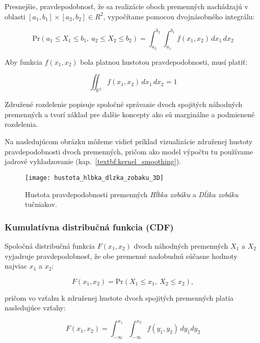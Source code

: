 Presnejšie, pravdepodobnosť, že sa realizácie oboch premenných nachádzajú v oblasti $[a_1, b_1] \times [a_2, b_2] \in R^2$, vypočítame pomocou dvojnásobného integrálu:

\begin{equation}
\mathrm{Pr}(a_1 \leq X_1 \leq b_1,\ a_2 \leq X_2 \leq b_2) = \int_{a_2}^{b_2} \int_{a_1}^{b_1} f(x_1, x_2) \, dx_1 \, dx_2
\end{equation}

Aby funkcia $f(x_1, x_2)$ bola platnou hustotou pravdepodobnosti, musí platiť:

\begin{equation}
\iint_{\mathbb{R}^2} f(x_1, x_2) \, dx_1 \, dx_2 = 1
\end{equation}

Združené rozdelenie popisuje spoločné správanie dvoch spojitých náhodných premenných a tvorí základ pre ďalšie koncepty ako sú marginálne a podmienené rozdelenia.

Na nasledujúcom obrázku môžeme vidieť príklad vizualizácie združenej hustoty pravdepodobnosti dvoch premenných, pričom ako model výpočtu tu používame jadrové vyhladzovanie (kap.~\ref{textbf:kernel_smoothing}).

\begin{figure}[htpb]
    \centering
    \texttt{[image: hustota\_hlbka\_dlzka\_zobaku\_3D]}
    \caption{Hustota pravdepodobnosti premenných \textit{Hĺbka zobáku} a \textit{Dĺžka zobáku} tučniakov.}
    \label{fig:zobak_joint_density}
\end{figure}

\subsubsection{Kumulatívna distribučná funkcia (CDF)}\label{subsec:joint_cdf}

Spoločná distribučná funkcia $F(x_1, x_2)$ dvoch náhodných premenných $X_1$ a $X_2$ vyjadruje pravdepodobnosť, že obe premenné nadobudnú súčasne hodnoty najviac $x_1$ a $x_2$:

\begin{equation}
F(x_1, x_2) = \mathrm{Pr}(X_1 \leq x_1,\ X_2 \leq x_2),
\end{equation}

pričom vo vzťahu k združenej hustote dvoch spojitých premenných platia nasledujúce vzťahy:

\begin{equation}
F(x_1, x_2) = \int_{-\infty}^{x_1} \int_{-\infty}^{x_2} f(y_1, y_2) \, dy_1 dy_2
\end{equation}

